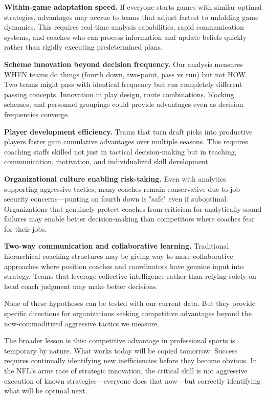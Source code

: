 \documentclass[11pt,twocolumn]{article}
\begin{document}
\textbf{Within-game adaptation speed.} If everyone starts games with similar optimal strategies, advantages may accrue to teams that adjust fastest to unfolding game dynamics. This requires real-time analysis capabilities, rapid communication systems, and coaches who can process information and update beliefs quickly rather than rigidly executing predetermined plans.

\textbf{Scheme innovation beyond decision frequency.} Our analysis measures WHEN teams do things (fourth down, two-point, pass vs run) but not HOW. Two teams might pass with identical frequency but run completely different passing concepts. Innovation in play design, route combinations, blocking schemes, and personnel groupings could provide advantages even as decision frequencies converge.

\textbf{Player development efficiency.} Teams that turn draft picks into productive players faster gain cumulative advantages over multiple seasons. This requires coaching staffs skilled not just in tactical decision-making but in teaching, communication, motivation, and individualized skill development.

\textbf{Organizational culture enabling risk-taking.} Even with analytics supporting aggressive tactics, many coaches remain conservative due to job security concerns---punting on fourth down is "safe" even if suboptimal. Organizations that genuinely protect coaches from criticism for analytically-sound failures may enable better decision-making than competitors where coaches fear for their jobs.

\textbf{Two-way communication and collaborative learning.} Traditional hierarchical coaching structures may be giving way to more collaborative approaches where position coaches and coordinators have genuine input into strategy. Teams that leverage collective intelligence rather than relying solely on head coach judgment may make better decisions.

None of these hypotheses can be tested with our current data. But they provide specific directions for organizations seeking competitive advantages beyond the now-commoditized aggressive tactics we measure.

The broader lesson is this: competitive advantage in professional sports is temporary by nature. What works today will be copied tomorrow. Success requires continually identifying new inefficiencies before they become obvious. In the NFL's arms race of strategic innovation, the critical skill is not aggressive execution of known strategies---everyone does that now---but correctly identifying what will be optimal next.
\end{document}
